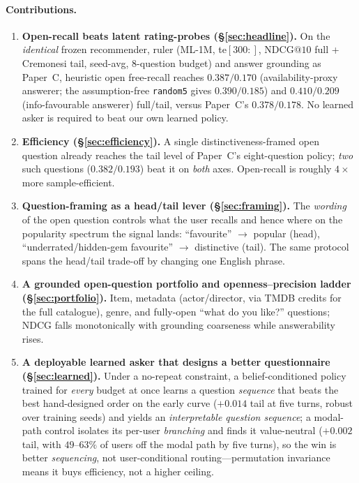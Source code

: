 \documentclass[11pt]{article}
\makeatletter
\newcommand{\ndcg}{\mathrm{NDCG@}10}
\makeatother
\begin{document}
\paragraph{Contributions.}
\begin{enumerate}
  \item \textbf{Open-recall beats latent rating-probes (\S\ref{sec:headline}).} On the \emph{identical} frozen
  recommender, ruler (ML-1M, te$[300{:}]$, $\ndcg$ full + Cremonesi tail, seed-avg, $8$-question budget) and answer
  grounding as Paper~C, heuristic open free-recall reaches $0.387/0.170$ (availability-proxy answerer; the assumption-free \texttt{random5} gives $0.390/0.185$) and $0.410/0.209$
  (info-favourable answerer) full/tail, versus Paper~C's $0.378/0.178$. No learned asker is required to beat our own
  learned policy.
  \item \textbf{Efficiency (\S\ref{sec:efficiency}).} A single distinctiveness-framed open question already reaches the
  tail level of Paper~C's eight-question policy; \emph{two} such questions ($0.382/0.193$) beat it on \emph{both} axes.
  Open-recall is roughly $4\times$ more sample-efficient.
  \item \textbf{Question-framing as a head/tail lever (\S\ref{sec:framing}).} The \emph{wording} of the open question
  controls what the user recalls and hence where on the popularity spectrum the signal lands: ``favourite'' $\to$
  popular (head), ``underrated/hidden-gem favourite'' $\to$ distinctive (tail). The same protocol spans the head/tail
  trade-off by changing one English phrase.
  \item \textbf{A grounded open-question portfolio and openness--precision ladder (\S\ref{sec:portfolio}).} Item, metadata
  (actor/director, via TMDB credits for the full catalogue), genre, and fully-open ``what do you like?'' questions; NDCG
  falls monotonically with grounding coarseness while answerability rises.
  \item \textbf{A deployable learned asker that designs a better questionnaire (\S\ref{sec:learned}).} Under a no-repeat
  constraint, a belief-conditioned policy trained for \emph{every} budget at once learns a question \emph{sequence} that
  beats the best hand-designed order on the early curve ($+0.014$ tail at five turns, robust over training seeds) and
  yields an \emph{interpretable question sequence}; a modal-path control isolates its per-user \emph{branching} and finds
  it value-neutral ($+0.002$ tail, with $49$--$63\%$ of users off the modal path by five turns), so the win is better
  \emph{sequencing}, not user-conditional routing---permutation invariance means it buys efficiency, not a higher ceiling.

\end{enumerate}
\end{document}
